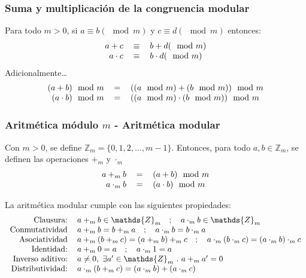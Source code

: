 \documentclass[../main.tex]{subfiles}
\begin{document}
\subsubsection{Suma y multiplicación de la congruencia modular}
Para todo $m > 0$, si $a \equiv b (\mod m)$ y $c \equiv d (\mod m)$ entonces:
\[
    \begin{tabular}{rcl}
        $a + c$ & $\equiv$ & $b + d (\mod m)$\\
        $a \cdot c$ & $\equiv$ & $b \cdot d (\mod m)$
    \end{tabular}
\]
Adicionalmente\dots
\[
    \begin{tabular}{rcl}
        $(a + b) \mod m$ & $=$ & $((a \mod m) + (b \mod m)) \mod m$\\
        $(a \cdot b) \mod m$ & $=$ & $((a \mod m) \cdot (b \mod m)) \mod m$
    \end{tabular}
\]

\subsubsection[Aritmética módulo m]{Aritmética módulo $m$ - Aritmética modular}
Con $m > 0$, se define $\mathds{Z}_m = \{ 0, 1, 2, \ldots, m - 1 \}$. Entonces, para todo $a,b \in \mathds{Z}_m$, se definen las operaciones $+_m$ y $\cdot_m$
\[
    \begin{tabular}{rcl}
        $a +_m b$ & $=$ & $(a+b) \mod m$\\
        $a \cdot_m b$ & $=$ & $(a \cdot b) \mod m$
    \end{tabular}
\]

La aritmética modular cumple con las siguientes propiedades:
\[
    \begin{tabular}{rl}
        Clausura: & $a +_m b \in \mathds{Z}_m \quad ; \quad a \cdot_m b \in \mathds{Z}_m$\\
        Conmutatividad & $a +_m b = b +_m a \quad ; \quad a \cdot_m b = b \cdot_m a$\\
        Asociatividad & $a +_m (b +_m c) = (a +_m b) +_m c \quad ; \quad a \cdot_m (b \cdot_m c) = (a \cdot_m b) \cdot_m c$\\
        Identidad: & $a +_m 0 = a \quad ; \quad a \cdot_m 1 = a$\\
        Inverso aditivo: & $a \not= 0,\ \exists a' \in \mathds{Z}_m\ .\ a +_m a' = 0$\\
        Distributividad: & $a \cdot_m (b +_m c) = (a \cdot_m b) + (a \cdot_m c)$\\
    \end{tabular}
\]
\end{document}
